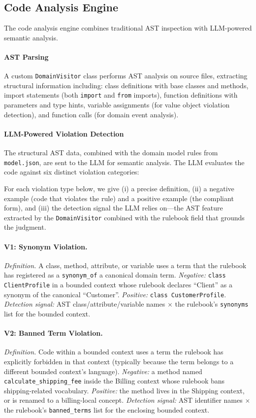 \documentclass[smallextended]{svjour3}
\begin{document}
\subsection{Code Analysis Engine}
\label{sec:arch_analysis}

The code analysis engine combines traditional AST inspection with LLM-powered semantic analysis.

\paragraph{AST Parsing}
A custom \texttt{DomainVisitor} class performs AST analysis on source files, extracting structural information including:
class definitions with base classes and methods,
import statements (both \texttt{import} and \texttt{from} imports),
function definitions with parameters and type hints,
variable assignments (for value object violation detection),
and function calls (for domain event analysis).

\paragraph{LLM-Powered Violation Detection}
The structural AST data, combined with the domain model rules from \texttt{model.json}, are sent to the LLM for semantic analysis.
The LLM evaluates the code against six distinct violation categories:

For each violation type below, we give (i) a precise definition, (ii) a negative example (code that violates the rule) and a positive example (the compliant form), and (iii) the detection signal the LLM relies on---the AST feature extracted by the \texttt{DomainVisitor} combined with the rulebook field that grounds the judgment.

\paragraph{V1: Synonym Violation.}
\emph{Definition.} A class, method, attribute, or variable uses a term that the rulebook has registered as a \texttt{synonym\_of} a canonical domain term.
\emph{Negative:} \texttt{class ClientProfile} in a bounded context whose rulebook declares ``Client'' as a synonym of the canonical ``Customer''.
\emph{Positive:} \texttt{class CustomerProfile}.
\emph{Detection signal:} AST class/attribute/variable names $\times$ the rulebook's \texttt{synonyms} list for the bounded context.

\paragraph{V2: Banned Term Violation.}
\emph{Definition.} Code within a bounded context uses a term the rulebook has explicitly forbidden in that context (typically because the term belongs to a different bounded context's language).
\emph{Negative:} a method named \texttt{calculate\_shipping\_fee} inside the Billing context whose rulebook bans shipping-related vocabulary.
\emph{Positive:} the method lives in the Shipping context, or is renamed to a billing-local concept.
\emph{Detection signal:} AST identifier names $\times$ the rulebook's \texttt{banned\_terms} list for the enclosing bounded context.
\end{document}
